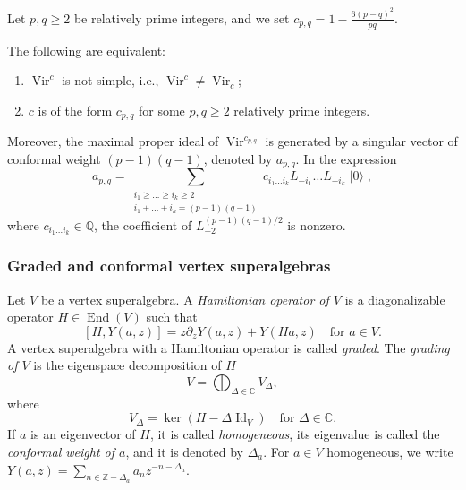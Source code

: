 \documentclass{beamer}
\DeclareMathOperator{\Vir}{Vir}
\DeclareMathOperator{\Id}{Id}
\DeclareMathOperator{\End}{End}
\DeclareMathOperator{\vac}{|0\rangle}
\begin{document}
\begin{frame}
  Let $p, q \ge 2$ be relatively prime integers, and we set $c_{p, q} = 1 - \frac{6(p - q)^2}{pq}$.

  \begin{theorem}
    \label{thr:3}
    The following are equivalent:
    \begin{enumerate}
    \item $\Vir^c$ is not simple, i.e., $\Vir^c \neq \Vir_c$;
    \item $c$ is of the form $c_{p, q}$ for some $p, q \ge 2$ relatively prime integers.
    \end{enumerate}
    Moreover, the maximal proper ideal of $\Vir^{c_{p, q}}$ is generated by a singular vector of conformal weight $(p - 1)(q - 1)$, denoted by $a_{p, q}$.
    In the expression
    \begin{equation*}
      a_{p, q} = \sum_{\substack{i_1 \ge \dots \ge i_k \ge 2 \\ i_1 + \dots + i_k = (p - 1)(q - 1)}}c_{i_1\dots i_k}L_{-i_1}\dots L_{-i_k}\vac,
    \end{equation*}
    where $c_{i_1\dots i_k} \in \mathbb{Q}$, the coefficient of $L_{-2}^{(p - 1)(q - 1)/2}$ is nonzero.
  \end{theorem}
\end{frame}

\begin{frame}
  \frametitle{Graded and conformal vertex superalgebras}
  Let $V$ be a vertex superalgebra.
  A \emph{Hamiltonian operator of $V$} is a diagonalizable operator $H \in \End(V)$ such that
  \begin{equation}
    \label{eq:1}
    [H, Y(a, z)] = z\partial_zY(a, z) + Y(Ha, z) \quad \text{for $a \in V$}.
  \end{equation}
  A vertex superalgebra with a Hamiltonian operator is called \emph{graded}.
  The \emph{grading of $V$} is the eigenspace decomposition of $H$
  \begin{equation*}
    V = \bigoplus_{\Delta \in \mathbb{C}}V_{\Delta},
  \end{equation*}
  where
  \begin{equation*}
    V_{\Delta} = \ker(H - \Delta\Id_V) \quad \text{for $\Delta \in \mathbb{C}$}.
  \end{equation*}
  If $a$ is an eigenvector of $H$, it is called \emph{homogeneous}, its eigenvalue is called the \emph{conformal weight of $a$}, and it is denoted by $\Delta_a$.
  For $a \in V$ homogeneous, we write $Y(a, z) = \sum_{n \in \mathbb{Z} - \Delta_a}a_nz^{-n - \Delta_a}$.
\end{frame}
\end{document}
